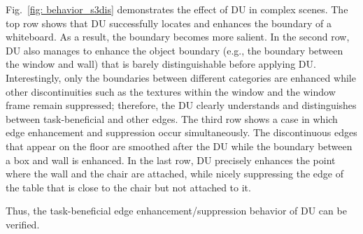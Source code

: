 \documentclass[a4paper,fleqn]{cas-dc}
\begin{document}
Fig.~\ref{fig: behavior_s3dis} demonstrates the effect of DU in complex scenes. The top row shows that DU successfully locates and enhances the boundary of a whiteboard. As a result, the boundary becomes more salient. 
In the second row, DU also manages to enhance the object boundary (e.g., the boundary between the window and wall) that is barely distinguishable before applying DU. Interestingly, only the boundaries between different categories are enhanced while other discontinuities such as the textures within the window and the window frame remain suppressed; therefore, the DU clearly understands and distinguishes between task-beneficial and other edges. 
The third row shows a case in which edge enhancement and suppression occur simultaneously. The discontinuous edges that appear on the floor are smoothed after the DU while the boundary between a box and wall is enhanced. In the last row, DU precisely enhances the point where the wall and the chair are attached, while nicely suppressing the edge of the table that is close to the chair but not attached to it.  

Thus, the task-beneficial edge enhancement/suppression behavior of DU can be verified.
\end{document}

